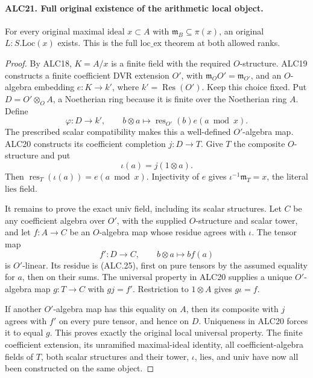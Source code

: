 \documentclass[11pt,a4paper]{article}
\numberwithin{equation}{section}
\theoremstyle{remark}\newtheorem{remark}[theorem]{Remark}
\begin{document}
\paragraph{ALC21. Full original existence of the arithmetic local object.}
\label{claim:ALC21}
For every original maximal ideal \(x\subset A\) with
\(\mathfrak m_B\subseteq\pi(x)\), an original
\(L:S.\mathrm{Loc}(x)\) exists.  This is the full
\(\mathrm{loc\_\allowbreak ex}\) theorem at both allowed ranks.

\begin{proof}
By ALC18, \(K=A/x\) is a finite field with the required
\(O\)-structure.  ALC19 constructs a finite coefficient
DVR extension \(O'\), with
\(\mathfrak m_OO'=\mathfrak m_{O'}\), and an
\(O\)-algebra embedding \(e:K\to k'\), where
\(k'=\operatorname{Res}(O')\).  Keep this choice fixed.
Put \(D=O'\otimes_O A\), a Noetherian ring because it
is finite over the Noetherian ring \(A\).  Define
\[
 \varphi:D\longrightarrow k',\qquad
       b\otimes a\longmapsto\operatorname{res}_{O'}(b)
                                  e(a\bmod x).
                                                        \tag{ALC.25}
\]
The prescribed scalar compatibility makes this a well-defined
\(O'\)-algebra map.  ALC20 constructs its coefficient
completion \(j:D\to T\).  Give \(T\) the composite
\(O\)-structure and put
\[
                     \iota(a)=j(1\otimes a).
                                                        \tag{ALC.26}
\]
Then
\(\operatorname{res}_T(\iota(a))=e(a\bmod x)\).
Injectivity of \(e\) gives
\(\iota^{-1}\mathfrak m_T=x\), the literal
\(\mathrm{lies}\) field.

It remains to prove the exact \(\mathrm{univ}\) field,
including its scalar structures.  Let \(C\) be any
coefficient algebra over \(O'\), with the supplied
\(O\)-structure and scalar tower, and let \(f:A\to C\)
be an \(O\)-algebra map whose residue agrees with
\(\iota\).  The tensor map
\[
               f':D\to C,\qquad b\otimes a\mapsto b f(a)
\]
is \(O'\)-linear.  Its residue is (ALC.25), first on
pure tensors by the assumed equality for \(a\), then
on their sums.  The universal property in ALC20 supplies
a unique \(O'\)-algebra map \(g:T\to C\) with
\(gj=f'\).  Restriction to \(1\otimes A\) gives
\(g\iota=f\).

If another \(O'\)-algebra map has this equality on \(A\),
then its composite with \(j\) agrees with \(f'\) on
every pure tensor, and hence on \(D\).  Uniqueness in
ALC20 forces it to equal \(g\).  This proves exactly the
original local universal property.  The finite coefficient
extension, its unramified maximal-ideal identity, all
coefficient-algebra fields of \(T\), both scalar structures
and their tower, \(\iota\), \(\mathrm{lies}\), and
\(\mathrm{univ}\) have now all been constructed on the
same object.
\end{proof}
\end{document}
